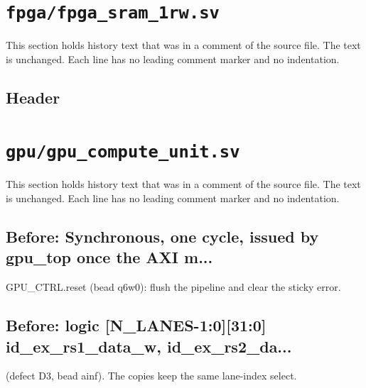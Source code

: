 \section{\texttt{fpga/fpga\_sram\_1rw.sv}}\label{cr:mod:fpga-sram-1rw}

This section holds history text that was in a comment of the source file. The text is unchanged. Each line has no leading comment marker and no indentation.

\begin{record}

\subsection*{Header}


\end{record}

\section{\texttt{gpu/gpu\_compute\_unit.sv}}\label{cr:mod:gpu-compute-unit}

This section holds history text that was in a comment of the source file. The text is unchanged. Each line has no leading comment marker and no indentation.

\begin{record}

\subsection*{Before: Synchronous, one cycle, issued by gpu\_top once the AXI m...}

\begin{textblock}
GPU_CTRL.reset (bead q6w0): flush the pipeline and clear the sticky error.
\end{textblock}

\subsection*{Before: logic [N\_LANES-1:0][31:0] id\_ex\_rs1\_data\_w, id\_ex\_rs2\_da...}

\begin{textblock}
(defect D3, bead ainf).  The copies keep the same lane-index select.
\end{textblock}

\end{record}

